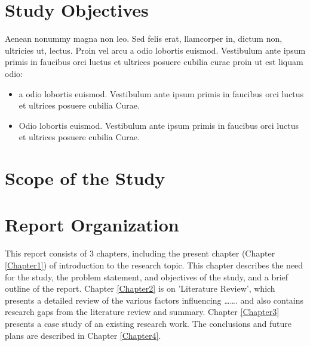 
\section{Study Objectives} \label{objectives}
\noindent
Aenean nonummy magna non leo. Sed felis erat, llamcorper in, dictum non, ultricies ut, lectus. Proin vel arcu a odio lobortis euismod. Vestibulum ante
ipsum primis in faucibus orci luctus et ultrices posuere cubilia curae proin ut est liquam odio:

\begin{itemize}

  \item a odio lobortis euismod. Vestibulum ante
    ipsum primis in faucibus orci luctus et ultrices posuere cubilia Curae.
  
  \item Odio lobortis euismod. Vestibulum ante
    ipsum primis in faucibus orci luctus et ultrices posuere cubilia Curae. 

\end{itemize}



\section{Scope of the Study}
\lipsum[15] 



\section{Report Organization}
This report consists of 3 chapters, including the present chapter (Chapter \ref{Chapter1}) of introduction to the research topic. This chapter describes the need for the study, the problem statement, and objectives of the study, and a brief outline of the report. Chapter \ref{Chapter2} is on 'Literature Review', which presents a detailed review of the various factors influencing \ldots \ldots. and also contains research gaps from the literature review and summary. Chapter \ref{Chapter3} presents a case study of an existing research work. The conclusions and future plans are described in Chapter \ref{Chapter4}.

